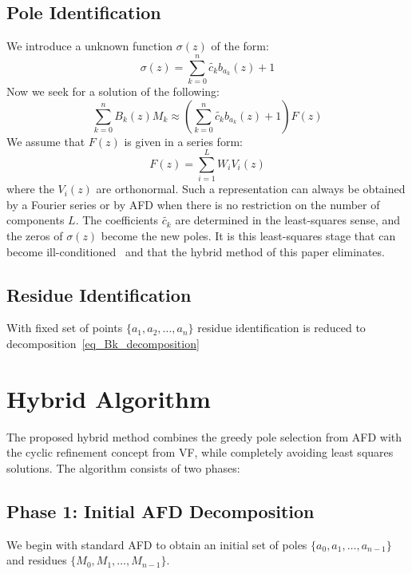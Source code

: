 \documentclass[journal]{IEEEtran}%
\begin{document}
\subsection{Pole Identification}
We introduce a unknown function $\sigma(z)$ of the form:
\begin{equation}
  \sigma(z) = \sum_{k=0}^{n} \tilde{c_k}b_{a_k}(z) + 1
\end{equation}
Now we seek for a solution of the following:
\begin{equation}
  \sum_{k=0}^n{B_k(z)M_k} \approx \left(\sum_{k=0}^{n}\tilde{c_k}b_{a_k}(z) + 1 \right)F(z)
\end{equation}
We assume that $F(z)$ is given in a series form:
\begin{equation}
  F(z) = \sum_{i=1}^{L} W_i V_i(z)
\end{equation}
where the $V_i(z)$ are orthonormal. Such a representation can always be obtained by a Fourier series or by AFD when there is no restriction on the number of components $L$. The coefficients $\tilde{c_k}$ are determined in the least-squares sense, and the zeros of $\sigma(z)$ become the new poles. It is this least-squares stage that can become ill-conditioned~\cite{gustavsen2006improving} and that the hybrid method of this paper eliminates.

\subsection{Residue Identification}
With fixed set of points $\{a_1, a_2, \ldots, a_n\}$ residue identification is reduced to decomposition~\eqref{eq_Bk_decomposition}


\section{Hybrid Algorithm}

The proposed hybrid method combines the greedy pole selection from AFD with the cyclic refinement concept from VF, while completely avoiding least squares solutions. The algorithm consists of two phases:

\subsection{Phase 1: Initial AFD Decomposition}

We begin with standard AFD to obtain an initial set of poles $\{a_0, a_1, \ldots, a_{n-1}\}$ and residues $\{M_0, M_1, \ldots, M_{n-1}\}$.
\end{document}
